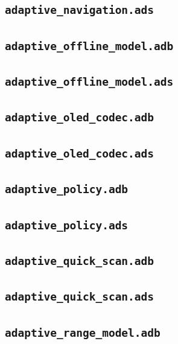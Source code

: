 \subsection*{\texttt{adaptive\_navigation.ads}}

\subsection*{\texttt{adaptive\_offline\_model.adb}}

\subsection*{\texttt{adaptive\_offline\_model.ads}}

\subsection*{\texttt{adaptive\_oled\_codec.adb}}

\subsection*{\texttt{adaptive\_oled\_codec.ads}}

\subsection*{\texttt{adaptive\_policy.adb}}

\subsection*{\texttt{adaptive\_policy.ads}}

\subsection*{\texttt{adaptive\_quick\_scan.adb}}

\subsection*{\texttt{adaptive\_quick\_scan.ads}}

\subsection*{\texttt{adaptive\_range\_model.adb}}

